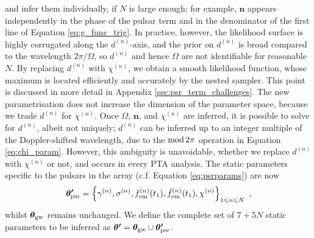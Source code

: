 \documentclass[fleqn,usenatbib,useAMS]{mnras}
\begin{document}
and infer them individually, if $N$ is large enough; for example, $\boldsymbol{n}$ appears independently in the phase of the pulsar term and in the denominator of the first line of Equation \eqref{eq:g_func_trig}. In practice, however, the likelihood surface is highly corrugated along the $d^{(n)}$-axis, and the prior on $d^{(n)}$ is broad compared to the wavelength $2\pi/\Omega$, so $d^{(n)}$ and hence $\Omega$ are not identifiable for reasonable $N$. By replacing $d^{(n)}$ with $\chi^{(n)}$, we obtain a smooth likelihood function, whose maximum is located efficiently and accurately by the nested sampler. This point is discussed in more detail in Appendix \ref{sec:psr_term_challenges}. The new parametrisation does not increase the dimension of the parameter space, because we trade $d^{(n)}$ for $\chi^{(n)}$. Once $\Omega$, ${\boldsymbol{n}}$, and $\chi^{(n)}$ are inferred, it is possible to solve for $d^{(n)}$, albeit not uniquely; $d^{(n)}$ can be inferred up to an integer multiple of the Doppler-shifted wavelength, due to the ${\rm mod} \, 2 \pi$ operation in Equation \eqref{eq:chi_param}. However, this ambiguity is unavoidable, whether we replace $d^{(n)}$ with $\chi^{(n)}$ or not, and occurs in every PTA analysis. The static parameters specific to the pulsars in the array (c.f. Equation \eqref{eq:psrparams}) are now
\begin{equation}
	\boldsymbol{\theta'}_{\rm psr} = \left \{ \gamma^{(n)},\sigma^{(n)}, f_{\rm em}^{(n)}(t_1),\dot{f}_{\rm em}^{(n)}(t_1),\chi^{(n)} \right\}_{1\leq n \leq N} \ ,  \label{eq:psrparamsnew}
\end{equation}
whilst $\boldsymbol{\theta}_{\rm gw}$  remains unchanged. We define the complete set of $7 +5N$ static parameters to be inferred as $\boldsymbol{\theta'} = \boldsymbol{\theta}_{\rm gw} \cup \boldsymbol{\theta'}_{\rm psr}$.  
%
\end{document}
